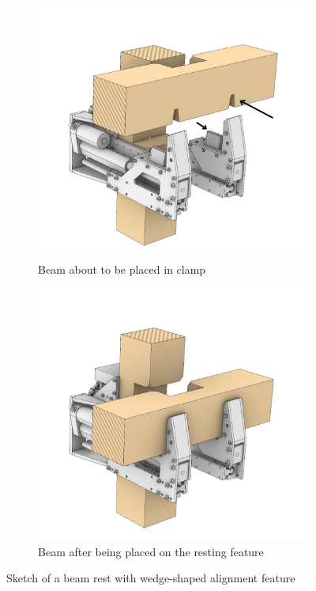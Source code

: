 \begin{figure}[p]
    \centering
    \begin{subfigure}[b]{0.49\textwidth}
        \centering
        \includegraphics[width=\textwidth]{images/04-3/beam-rest-arrow.jpg}
        \caption{Beam about to be placed in clamp}
    \end{subfigure}
    \hfill
    \begin{subfigure}[b]{0.49\textwidth}
        \centering
        \includegraphics[width=\textwidth]{images/04-3/beam-rest2.jpg}
        \caption{Beam after being placed on the resting feature}
    \end{subfigure}
    \caption{Sketch of a beam rest with wedge-shaped alignment feature} 
    \label{fig:beam-rest-feature}
\end{figure}


